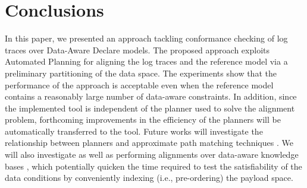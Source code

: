 \section{Conclusions}\label{sec:end}
In this paper, we presented an approach tackling conformance checking of log traces over Data-Aware Declare models. The proposed approach exploits Automated Planning for aligning the log traces and the reference model via a preliminary partitioning of the data space. The experiments show that the performance of the approach is acceptable even when the reference model contains a reasonably large number of data-aware constraints. In addition, since the implemented tool is independent of the planner used to solve the alignment problem, forthcoming improvements in the efficiency of the planners will be automatically transferred to the tool.
%
Future works will investigate the relationship between planners and approximate path matching techniques \cite{Myers1989}. We will also investigate  as well as performing alignments over data-aware knowledge bases \cite{10.1007/978-3-319-39696-5_18}, which potentially quicken the time required to test the satisfiability of the data conditions by conveniently indexing (i.e., pre-ordering) the payload space.  %
